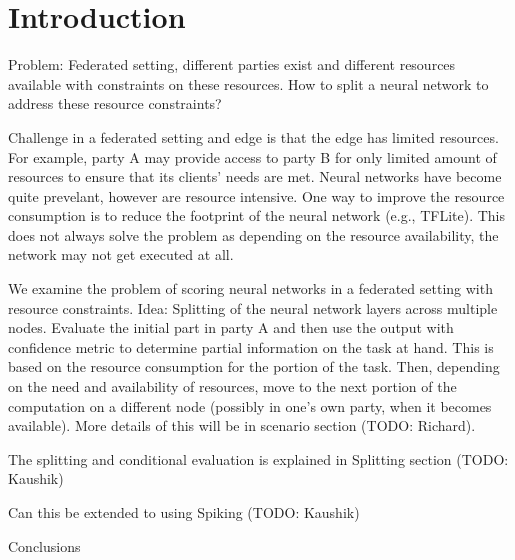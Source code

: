 \section{Introduction}
\label{sec:intro}

Problem: Federated setting, different parties exist and different resources available with constraints
on these resources. How to split a neural network to address these resource constraints?

Challenge in a federated setting and edge is that the edge has limited resources. For example, party A
may provide access to party B for only limited amount of resources to ensure that its clients' needs are met.
Neural networks have become quite prevelant, however are resource intensive. One way to improve the resource
consumption is to reduce the footprint of the neural network (e.g., TFLite). This does not always solve the
problem as depending on the resource availability, the network may not get executed at all. 

We examine the problem of scoring neural networks in a federated setting with resource constraints.
Idea: Splitting of the neural network layers across multiple nodes. Evaluate the initial part in party A and then
use the output with confidence metric to determine partial information on the task at hand. This is
based on the resource consumption for the portion of the task. Then, depending on the need and availability of 
resources, move to the next portion of the computation on a different node (possibly in one's own party, when it becomes
available). More details of this will be in scenario section (TODO: Richard).

The splitting and conditional evaluation is explained in Splitting section (TODO: Kaushik)

Can this be extended to using Spiking (TODO: Kaushik)

Conclusions
